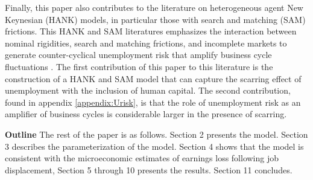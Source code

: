 Finally, this paper also contributes to the literature on heterogeneous agent New Keynesian (HANK) models, in particular those with search and matching (SAM) frictions. This HANK and SAM literatures emphasizes the interaction between nominal rigidities, search and matching frictions, and incomplete markets to generate counter-cyclical unemployment risk that amplify business cycle fluctuations \citep{McKay2016, ravn2017job, den2018unemployment}. The first contribution of this paper to this literature is the construction of a HANK and SAM model that can capture the scarring effect of unemployment with the inclusion of human capital. The second contribution, found in appendix \ref{appendix:Urisk}, is that the role of unemployment risk as an amplifier of business cycles is considerable larger in the presence of scarring.

\textbf{Outline} The rest of the paper is as follows. Section 2 presents the model. Section 3 describes the parameterization of the model. Section 4 shows that the model is consistent with the microeconomic estimates of earnings loss following job displacement, Section 5 through 10 presents the results. Section 11 concludes. \\ 